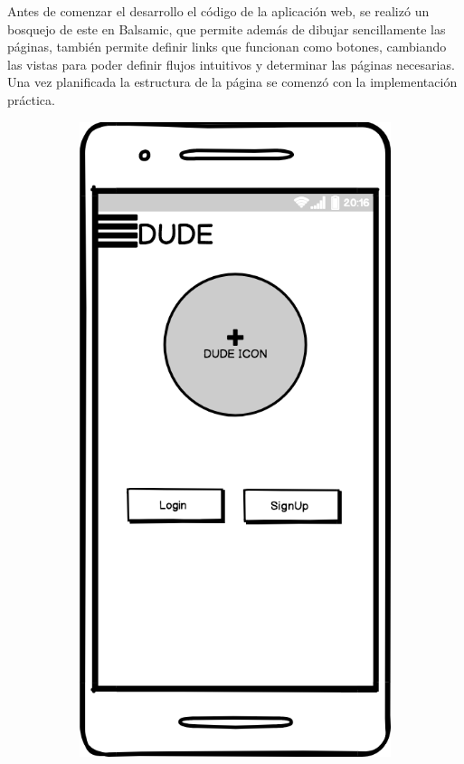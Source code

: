 Antes de comenzar el desarrollo el código de la aplicación web, se realizó un bosquejo de este en Balsamic, que permite además de dibujar sencillamente las páginas, también permite definir links que funcionan como botones, cambiando las vistas para poder definir flujos intuitivos y determinar las páginas necesarias. Una vez planificada la estructura de la página se comenzó con la implementación práctica.

\begin{figure}[H]
  \centering
  \begin{subfigure}[b]{0.20\textwidth}
    \includegraphics[width=\textwidth, keepaspectratio]{images/balsamiq01}

\end{subfigure}
\end{figure}
